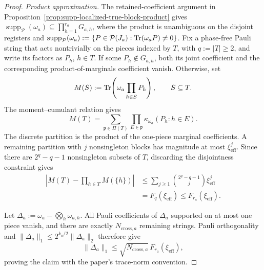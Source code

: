 \documentclass[
  aps,
  prx,
  reprint,
  superscriptaddress,
  amsmath,
  amssymb,
  nofootinbib,
  longbibliography
]{revtex4-2}
\newcommand{\Pc}{\mathcal{P}}
\begin{document}
\begin{proof}
\emph{Product approximation.}
The retained-coefficient argument in
Proposition~\ref{prop:supp-localized-true-block-product} gives
$\operatorname{supp}_{\Pc}(\omega_a)
\subseteq\prod_{h=1}^{r_a}G_{a,h}$, where the product is unambiguous on
the disjoint registers and
$\operatorname{supp}_{\Pc}(\omega_a)
:=\{P\in\Pc(J_a):\Tr(\omega_aP)\ne0\}$.
Fix a phase-free Pauli string that acts nontrivially on the pieces indexed
by $T$, with $q:=|T|\ge2$, and write its factors as $P_h$, $h\in T$.
If some $P_h\notin G_{a,h}$, both its joint coefficient and the
corresponding product-of-marginals coefficient vanish.  Otherwise, set
\begin{equation}
M(S)
:=
\Tr\!\left(\omega_a\prod_{h\in S}P_h\right),
\qquad S\subseteq T.
\end{equation}
The moment--cumulant relation gives
\begin{equation}
M(T)
=
\sum_{\mathfrak p\in\Pi(T)}
\prod_{E\in\mathfrak p}
\kappa_{\omega_a}(P_h:h\in E).
\end{equation}
The discrete partition is the product of the one-piece marginal
coefficients.  A remaining partition with $j$ nonsingleton blocks has
magnitude at most $\xi_{\mathrm{eff}}^j$.  Since there are
$2^q-q-1$ nonsingleton subsets of $T$, discarding the disjointness
constraint gives
\begin{align}
\left|
M(T)-\prod_{h\in T}M(\{h\})
\right|
&\le
\sum_{j\ge1}
\binom{2^q-q-1}{j}\xi_{\mathrm{eff}}^j
\nonumber\\
&=
F_q(\xi_{\mathrm{eff}})
\le
F_{r_a}(\xi_{\mathrm{eff}}).
\label{eq:supp-split-moment-factorization-error}
\end{align}

Let
$\Delta_a:=\omega_a-\bigotimes_h\omega_{a,h}$.
All Pauli coefficients of $\Delta_a$ supported on at most one piece
vanish, and there are exactly $N_{\mathrm{cross},a}$ remaining strings.
Pauli orthogonality and
$\|\Delta_a\|_1\le2^{k_a/2}\|\Delta_a\|_2$ therefore give
\begin{equation}
\|\Delta_a\|_1
\le
\sqrt{N_{\mathrm{cross},a}}\,F_{r_a}(\xi_{\mathrm{eff}}),
\end{equation}
proving the claim with the paper's trace-norm convention.
\end{proof}
\end{document}
